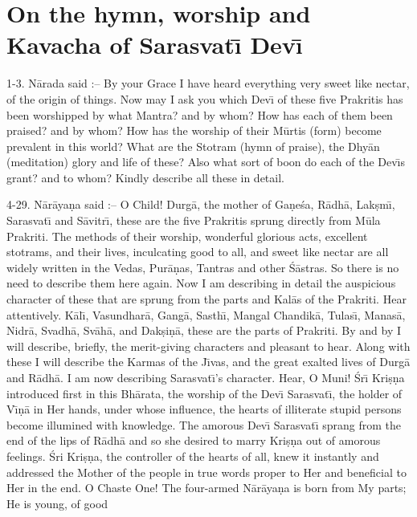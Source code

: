 \chapter{On the hymn, worship and Kavacha of Sarasvat\={\i} Dev\={\i}}

1-3. N\=arada said :-- By your Grace I have heard everything very sweet like nectar, of the origin of things. Now may I ask you which Dev\={\i} of these five Prakritis has been worshipped by what Mantra? and by whom? How has each of them been praised? and by whom? How has the worship of their M\=urtis (form) become prevalent in this world? What are the Stotram (hymn of praise), the Dhy\=an (meditation) glory and life of these? Also what sort of boon do each of the Dev\={\i}s grant? and to whom? Kindly describe all these in detail.

4-29. N\=ar\=aya\d{n}a said :-- O Child! Durg\=a, the mother of Ga\d{n}e\'sa, R\=adh\=a, Lak\d{s}m\={\i}, Sarasvat\={\i} and S\=avitr\={\i}, these are the five Prakritis sprung directly from M\=ula Prakriti. The methods of their worship, wonderful glorious acts, excellent stotrams, and their lives, inculcating good to all, and sweet like nectar are all widely written in the Vedas, Pur\=a\d{n}as, Tantras and other \'S\=astras. So there is no need to describe them here again. Now I am describing in detail the auspicious character of these that are sprung from the parts and Kal\=as of the Prakriti. Hear attentively. K\=al\={\i}, Vasundhar\=a, Gang\=a, Sasth\={\i}, Mangal Chandik\=a, Tulas\={\i}, Manas\=a, Nidr\=a, Svadh\=a, Sv\=ah\=a, and Dak\d{s}i\d{n}\=a, these are the parts of Prakriti. By and by I will describe, briefly, the merit-giving characters and pleasant to hear. Along with these I will describe the Karmas of the J\={\i}vas, and the great exalted lives of Durg\=a and R\=adh\=a. I am now describing Sarasvat\={\i}'s character. Hear, O Muni! \'Sr\={\i} Kri\d{s}\d{n}a introduced first in this Bh\=arata, the worship of the Dev\={\i} Sarasvat\={\i}, the holder of V\={\i}\d{n}\=a in Her hands, under whose influence, the hearts of illiterate stupid persons become illumined with knowledge. The amorous Dev\={\i} Sarasvat\={\i} sprang from the end of the lips of R\=adh\=a and so she desired to marry Kri\d{s}\d{n}a out of amorous feelings. \'Sri Kri\d{s}\d{n}a, the controller of the hearts of all, knew it instantly and addressed the Mother of the people in true words proper to Her and beneficial to Her in the end. O Chaste One! The four-armed N\=ar\=aya\d{n}a is born from My parts; He is young, of good

